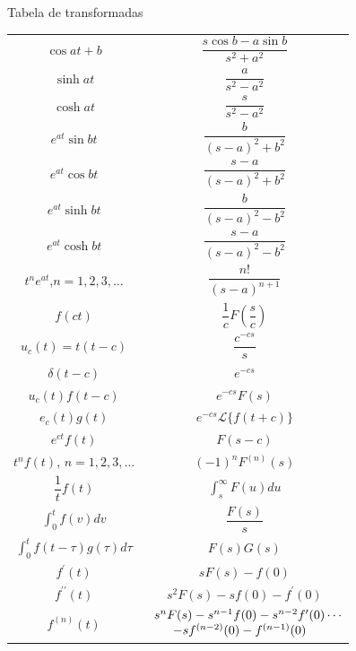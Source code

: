 \begin{frame}[allowframebreaks]{Tabela de transformadas}
\begin{longtable}{cc}
	$ \cos{at+b} $ & $ \dfrac{s\cos{b}-a\sin{b}}{s^{2}+a^{2}} $\\\addlinespace
	$ \sinh{at} $ & $ \dfrac{a}{s^{2}-a^{2}} $\\\addlinespace\midrule\addlinespace[0.2cm]
	$ \cosh{at} $ & $ \dfrac{s}{s^{2}-a^{2}} $\\\addlinespace\midrule\addlinespace[0.2cm]
	$ e^{at}\sin{bt} $ & $ \dfrac{b}{\left(s-a\right)^{2}+b^{2}} $\\\addlinespace\midrule\addlinespace[0.2cm]
	$ e^{at}\cos{bt} $ & $ \dfrac{s-a}{\left(s-a\right)^{2}+b^{2}} $\\\addlinespace\midrule\addlinespace[0.2cm]
	$ e^{at}\sinh{bt} $ & $ \dfrac{b}{\left(s-a\right)^{2}-b^{2}} $\\\addlinespace\midrule\addlinespace[0.2cm]
	$ e^{at}\cosh{bt} $ & $ \dfrac{s-a}{\left(s-a\right)^{2}-b^{2}} $\\\addlinespace\midrule\addlinespace[0.2cm]
	$ t^{n}e^{at} $,$ n=1,2,3,\ldots $ & $ \dfrac{n!}{\left(s-a\right)^{n+1}} $\\\addlinespace\midrule\addlinespace[0.2cm]
	$ f(ct) $ & $ \dfrac{1}{c}F\left( \dfrac{s}{c} \right)  $\\\addlinespace\midrule\addlinespace[0.2cm]
	$ u_{c}(t)=t(t-c) $ & $ \dfrac{c^{-cs}}{s} $\\\addlinespace\midrule\addlinespace[0.2cm]
	$ \delta(t-c) $ & $ e^{-cs} $\\\addlinespace\midrule\addlinespace[0.2cm]
	$ u_{c}(t)f(t-c) $ & $ e^{-cs}F(s) $\\\addlinespace\midrule\addlinespace[0.2cm]
	$ e_{c}(t)g(t) $ & $ e^{-cs}\mathscr{L}\{f(t+c)\} $\\\addlinespace\midrule\addlinespace[0.2cm]
	$ e^{ct}f(t) $ & $ F(s-c) $\\\addlinespace[0.2cm]\midrule\addlinespace[0.2cm]
	$ t^{n}f(t) $, $ n=1,2,3,\ldots $ & $ (-1)^{n}F^{(n)}(s)  $\\\addlinespace
	$ \dfrac{1}{t}f(t) $ & $ \displaystyle \int_{s}^{\infty}F(u)du $\\\addlinespace\midrule\addlinespace[0.2cm]
	$ \displaystyle \int_{0}^{t}f(v)dv $ & $ \dfrac{F(s)}{s}  $\\\addlinespace\midrule\addlinespace[0.2cm]
	$ \displaystyle\int_{0}^{t}f(t-\tau)g(\tau)d\tau $ & $F(s)G(s)  $\\\addlinespace\midrule\addlinespace[0.2cm]
	$ f^\prime(t) $ & $ sF(s)-f(0) $\\\addlinespace[0.2cm]\midrule\addlinespace[0.2cm]
	$ f^{\prime\prime}(t) $ & $ s^{2}F(s)-sf(0)-f^\prime(0) $\\\addlinespace\midrule\addlinespace[0.2cm]
	$ f^{(n)}(t) $ & $\begin{array} {c@{}l@{}} s^{n}F(s)- s^{n-1}f(0)-s^{n-2}f^\prime(0)&{}\cdots\\-sf^{(n-2)}(0)-f^{(n-1)}(0)& \end{array}$ \\\bottomrule
\end{longtable}
\end{frame}

